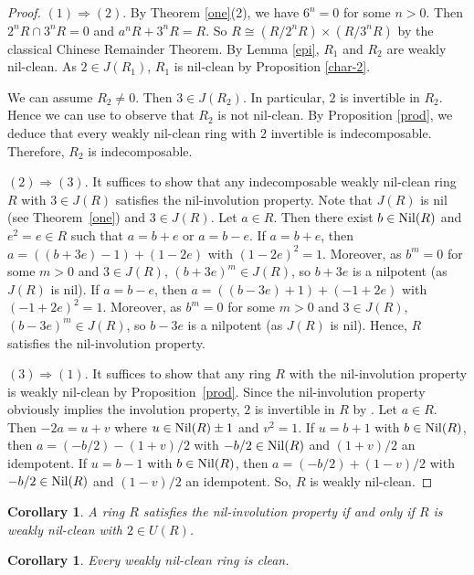\documentclass[12]{amsart}
\newtheorem{cor}[thm]{Corollary}
\theoremstyle{definition}
\numberwithin{equation}{section}
\begin{document}
\begin{proof}
$(1)\Rightarrow (2)$. By Theorem \ref{one}(2), we have $6^n=0$ for some $n>0$. Then $2^nR\cap 3^nR=0$ and $a^nR+3^nR=R$.
So $R\cong (R/2^nR)\times (R/3^nR)$ by the classical Chinese Remainder Theorem. By Lemma \ref{epi}, $R_1$ and $R_2$ are weakly nil-clean. As $2\in J(R_1)$, $R_1$ is nil-clean by Proposition \ref{char-2}. 

We can assume $R_2\not= 0$. Then $3\in J(R_2)$. In particular, $2$ is invertible in $R_2$. Hence we can use \cite[Proposition 3.14]{D13}
to observe that $R_2$ is not nil-clean. By Proposition \ref{prod}, we deduce that every weakly nil-clean ring with $2$ invertible
is indecomposable. Therefore, $R_2$ is indecomposable.

$(2)\Rightarrow (3)$. It suffices to show that any indecomposable weakly nil-clean ring $R$ with $3\in J(R)$ satisfies the nil-involution property. Note that $J(R)$ is nil (see Theorem~\ref{one}) and $3\in J(R)$. Let $a\in R$. Then there exist $b\in {\rm Nil}(R)$ and $e^2=e\in R$ such that $a=b+e$ or $a=b-e$. If $a=b+e$, then $a=((b+3e)-1)+(1-2e)$ with $(1-2e)^2=1$. Moreover, as $b^m=0$ for some $m>0$ and $3\in J(R)$, $(b+3e)^m\in J(R)$, so $b+3e$ is a nilpotent (as $J(R)$ is nil). If $a=b-e$, then $a=((b-3e)+1)+(-1+2e)$ with $(-1+2e)^2=1$. Moreover, as $b^m=0$ for some $m>0$ and $3\in J(R)$, $(b-3e)^m\in J(R)$, so $b-3e$ is a nilpotent (as $J(R)$ is nil). Hence, $R$ satisfies the nil-involution property.

$(3)\Rightarrow (1)$. It suffices to show that any ring $R$ with the nil-involution property is weakly nil-clean by Proposition~\ref{prod}. Since the nil-involution property obviously implies the involution property, $2$ is invertible in $R$ by \cite[Theorem 3.5]{FY08}. Let $a\in R$. Then $-2a=u+v$ where $u\in {\rm Nil}(R)\pm 1$ and $v^2=1$.  If $u=b+1$ with $b\in {\rm Nil}(R)$, then $a=(-b/2)-(1+v)/2$ with
$-b/2\in {\rm Nil}(R)$ and $(1+v)/2$ an idempotent. If $u=b-1$ with $b\in {\rm Nil}(R)$, then $a=(-b/2)+(1-v)/2$ with
$-b/2\in {\rm Nil}(R)$ and $(1-v)/2$ an idempotent. So, $R$ is weakly nil-clean.
\end{proof}

\begin{cor}\label{invol}
A ring $R$ satisfies the nil-involution property if and only if $R$ is weakly nil-clean with $2\in U(R)$.
\end{cor}

\begin{cor}\label{cor7}
Every weakly nil-clean ring is clean.
\end{cor}
\end{document}

